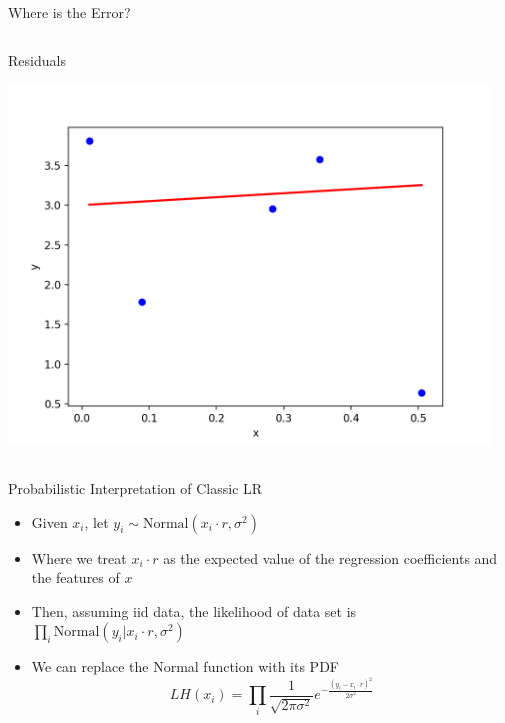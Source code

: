 \documentclass[aspectratio=169]{beamer}
\begin{document}
\begin{frame}{Where is the Error?}

\begin{columns}
\begin{column}{0.5\textwidth}
\begin{center}Residuals
\end{center}
     \includegraphics[width=1\textwidth]{lectGLM/LRgenmodelResidual.png} 
 \end{column}
\begin{column}{0.5\textwidth}
\begin{center}
\end{center}

\end{column}
 \end{columns}

\end{frame}

\begin{frame}{Probabilistic Interpretation of Classic LR}

	\begin{itemize}
	\item Given $x_i$, let $y_i \sim \textrm{Normal} (x_i \cdot r, \sigma^2)$ %
	\item Where we treat $x_i \cdot r$ as the expected value of the regression coefficients and the features of $x$
	\item Then, assuming iid data, the likelihood of data set is $\prod_i \textrm{Normal} (y_i | x_i \cdot r, \sigma^2)$
	\item We can replace the Normal function with its PDF
	$$LH(x_i) = \prod_i \frac{1}{\sqrt{2\pi\sigma^2}} 
                e^{-\frac{(y_i - x_i \cdot r)^2}{2\sigma^2}}$$
	\end{itemize}
\end{frame}
\end{document}
